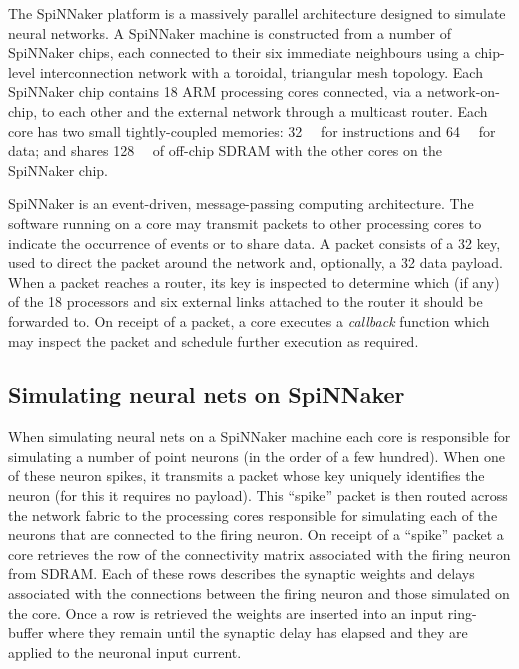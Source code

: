 \documentclass[conference]{IEEEtran}
\begin{document}
The SpiNNaker platform is a massively parallel architecture designed to simulate neural networks.
A SpiNNaker machine is constructed from a number of SpiNNaker chips, each connected to their six immediate neighbours using a chip-level interconnection network with a toroidal, triangular mesh topology.
Each SpiNNaker chip contains 18 ARM processing cores connected, via a network-on-chip, to each other and the external network through a multicast router.
Each core has two small tightly-coupled memories: \SI{32}{\kibi\byte} for instructions and \SI{64}{\kibi\byte} for data; and shares \SI{128}{\mebi\byte} of off-chip SDRAM with the other cores on the SpiNNaker chip.

SpiNNaker is an event-driven, message-passing computing architecture.
The software running on a core may transmit packets to other processing cores to indicate the occurrence of events or to share data.
A packet consists of a \SI{32}{\bit} key, used to direct the packet around the network and, optionally, a \SI{32}{\bit} data payload.
When a packet reaches a router, its key is inspected to determine which (if any) of the 18 processors and six external links attached to the router it should be forwarded to.
On receipt of a packet, a core executes a \textit{callback} function which may inspect the packet and schedule further execution as required.

  \subsection{Simulating neural nets on SpiNNaker}
  \label{sec:background/nn}

When simulating neural nets on a SpiNNaker machine each core is responsible for simulating a number of point neurons (in the order of a few hundred).
When one of these neuron spikes, it transmits a packet whose key uniquely identifies the neuron (for this it requires no payload).
This ``spike'' packet is then routed across the network fabric to the processing cores responsible for simulating each of the neurons that are connected to the firing neuron.
On receipt of a ``spike'' packet a core retrieves the row of the connectivity matrix associated with the firing neuron from SDRAM.
Each of these rows describes the synaptic weights and delays associated with the connections between the firing neuron and those simulated on the core.
Once a row is retrieved the weights are inserted into an input ring-buffer where they remain until the synaptic delay has elapsed and they are applied to the neuronal input current.
\end{document}
